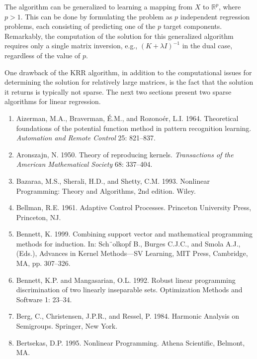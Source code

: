 \documentclass[fleqn,10pt]{olplainarticle}
\begin{document}
The algorithm can be generalized to learning a mapping from $X$ to $\mathbb{R}^p$, where $p > 1$. This can be done by formulating the problem as $p$ independent regression problems, each consisting of predicting one of the $p$ target components. Remarkably, the computation of the solution for this generalized algorithm requires only a single matrix inversion, e.g., $(K + \lambda I)^{-1}$ in the dual case, regardless of the value of $p$.

One drawback of the KRR algorithm, in addition to the computational issues for determining the solution for relatively large matrices, is the fact that the solution it returns is typically not sparse. The next two sections present two sparse algorithms for linear regression.



\begin{enumerate}
    \item Aizerman, M.A., Braverman, \'E.M., and Rozono\'er, L.I. 1964. Theoretical foundations of the potential function method in pattern recognition learning. \textit{Automation and Remote Control} 25: 821–837.
    
    \item Aronszajn, N. 1950. Theory of reproducing kernels. \textit{Transactions of the American Mathematical Society} 68: 337–404.

    \item Bazaraa, M.S., Sherali, H.D., and Shetty, C.M. 1993. Nonlinear Programming: Theory and Algorithms, 2nd edition. Wiley.

    \item Bellman, R.E. 1961. Adaptive Control Processes. Princeton University Press, Princeton, NJ.

    \item Bennett, K. 1999. Combining support vector and mathematical programming methods for induction. In: Sch¨olkopf B., Burges C.J.C., and Smola A.J., (Eds.), Advances in Kernel Methods—SV Learning, MIT Press, Cambridge, MA, pp. 307–326.

    \item Bennett, K.P. and Mangasarian, O.L. 1992. Robust linear programming discrimination of two linearly inseparable sets. Optimization Methods and Software 1: 23–34.

    \item Berg, C., Christensen, J.P.R., and Ressel, P. 1984. Harmonic Analysis on Semigroups. Springer, New York.

    \item Bertsekas, D.P. 1995. Nonlinear Programming. Athena Scientific, Belmont, MA.


\end{enumerate}
\end{document}
